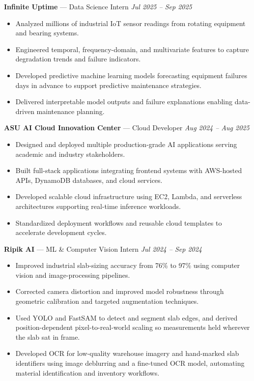 \documentclass[a4paper,8pt]{extarticle}
\begin{document}
\noindent
\textbf{Infinite Uptime} --- Data Science Intern
\hfill \textit{Jul 2025 -- Sep 2025}

\begin{itemize}
\item Analyzed millions of industrial IoT sensor readings from rotating equipment and bearing systems.
\item Engineered temporal, frequency-domain, and multivariate features to capture degradation trends and failure indicators.
\item Developed predictive machine learning models forecasting equipment failures days in advance to support predictive maintenance strategies.
\item Delivered interpretable model outputs and failure explanations enabling data-driven maintenance planning.
\end{itemize}

\noindent
\textbf{ASU AI Cloud Innovation Center} --- Cloud Developer
\hfill \textit{Aug 2024 -- Aug 2025}

\begin{itemize}
\item Designed and deployed multiple production-grade AI applications serving academic and industry stakeholders.
\item Built full-stack applications integrating frontend systems with AWS-hosted APIs, DynamoDB databases, and cloud services.
\item Developed scalable cloud infrastructure using EC2, Lambda, and serverless architectures supporting real-time inference workloads.
\item Standardized deployment workflows and reusable cloud templates to accelerate development cycles.
\end{itemize}

\noindent
\textbf{Ripik AI} --- ML \& Computer Vision Intern
\hfill \textit{Jul 2024 -- Sep 2024}

\begin{itemize}
\item Improved industrial slab-sizing accuracy from 76\% to 97\% using computer vision and image-processing pipelines.
\item Corrected camera distortion and improved model robustness through geometric calibration and targeted augmentation techniques.
\item Used YOLO and FastSAM to detect and segment slab edges, and derived position-dependent pixel-to-real-world scaling so measurements held wherever the slab sat in frame.
\item Developed OCR for low-quality warehouse imagery and hand-marked slab identifiers using image deblurring and a fine-tuned OCR model, automating material identification and inventory workflows.
\end{itemize}
\end{document}
